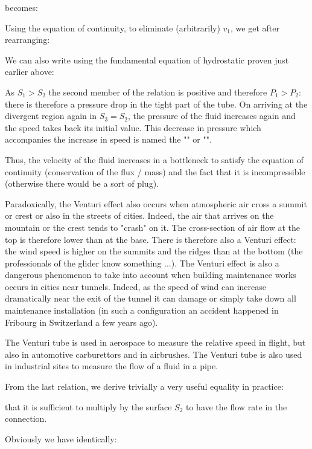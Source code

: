 	becomes:
	
	Using the equation of continuity, to eliminate (arbitrarily) $v_1$, we get after rearranging:
	
	We can also write using the fundamental equation of hydrostatic proven just earlier above:
	
	As $S_1>S_2$ the second member of the relation is positive and therefore $P_1>P_2$: there is therefore a pressure drop in the tight part of the tube. On arriving at the divergent region again in $S_3=S_2$, the pressure of the fluid increases again and the speed takes back its initial value. This decrease in pressure which accompanies the increase in speed is named the "" or "".

	Thus, the velocity of the fluid increases in a bottleneck to satisfy the equation of continuity (conservation of the flux / mass) and the fact that it is incompressible (otherwise there would be a sort of plug).	
	\begin{tcolorbox}[title=Remark,colframe=black,arc=10pt]
	Paradoxically, the Venturi effect also occurs when atmospheric air cross a summit or crest  or also in the streets of cities. Indeed, the air that arrives on the mountain or the crest tends to "crash" on it. The cross-section of air flow at the top is therefore lower than at the base. There is therefore also a Venturi effect: the wind speed is higher on the summits and the ridges than at the bottom (the professionals of the glider know something ...). The Venturi effect is also a dangerous phenomenon to take into account when building maintenance works occurs in cities near tunnels. Indeed, as the speed of wind can increase dramatically near the exit of the tunnel it can damage or simply take down all maintenance installation (in such a configuration an accident happened in Fribourg in Switzerland a few years ago).
	\end{tcolorbox}
	The Venturi tube is used in aerospace to measure the relative speed in flight, but also in automotive carburettors and in airbrushes. The Venturi tube is also used in industrial sites to measure the flow of a fluid in a pipe.
	
	From the last relation, we derive trivially a very useful equality in practice:
	
	that it is sufficient to multiply by the surface $S_2$ to have the flow rate in the connection. 

	Obviously we have identically:
	
